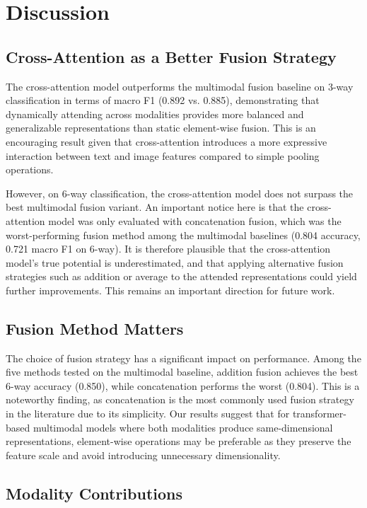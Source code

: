 \section{Discussion}

\subsection{Cross-Attention as a Better Fusion Strategy}

The cross-attention model outperforms the multimodal fusion baseline on 3-way classification in terms of macro F1 (0.892 vs. 0.885), demonstrating that dynamically attending across modalities provides more balanced and generalizable representations than static element-wise fusion. This is an encouraging result given that cross-attention introduces a more expressive interaction between text and image features compared to simple pooling operations.

However, on 6-way classification, the cross-attention model does not surpass the best multimodal fusion variant. An important notice here is that the cross-attention model was only evaluated with concatenation fusion, which was the worst-performing fusion method among the multimodal baselines (0.804 accuracy, 0.721 macro F1 on 6-way). It is therefore plausible that the cross-attention model's true potential is underestimated, and that applying alternative fusion strategies such as addition or average to the attended representations could yield further improvements. This remains an important direction for future work.

\subsection{Fusion Method Matters}

The choice of fusion strategy has a significant impact on performance. Among the five methods tested on the multimodal baseline, addition fusion achieves the best 6-way accuracy (0.850), while concatenation performs the worst (0.804). This is a noteworthy finding, as concatenation is the most commonly used fusion strategy in the literature due to its simplicity. Our results suggest that for transformer-based multimodal models where both modalities produce same-dimensional representations, element-wise operations may be preferable as they preserve the feature scale and avoid introducing unnecessary dimensionality.

\subsection{Modality Contributions}

